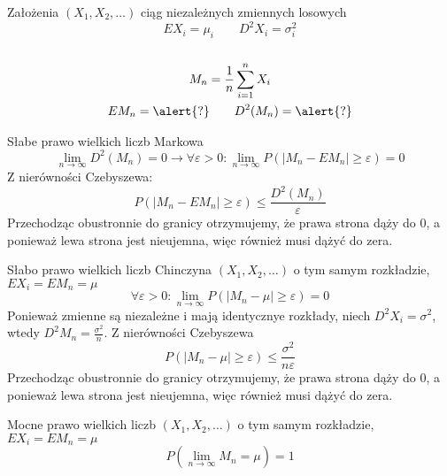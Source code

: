 \documentclass{mp}
\subtitle{Prawa wielkich liczb}
\begin{document}
\frame{\titlepage}
\begin{frame}{Założenia}
$(X_1,X_2,\ldots)$ ciąg niezależnych zmiennych losowych\\
\[EX_i=\mu_i \qquad D^2X_i=\sigma_i^2\] \\
\pause
\begin{gather*}
M_n=\frac{1}{n}\sum_{i=1}^n X_i \\
EM_n=\alert{?} \qquad D^2(M_n)=\alert{?}
\end{gather*}
\note{\[EM_n=\frac{1}{n}\sum_{i=1}^n \mu_i \qquad D^2(M_n)=\frac{1}{n^2}\sum_{i=1}^n\sigma_i^2\]}
\end{frame}
\begin{frame}{Słabe prawo wielkich liczb Markowa}
\[ \lim_{n\to\infty} D^2(M_n)=0 \to \forall \varepsilon>0\colon \lim_{n\to\infty} P(\left|M_n-EM_n\right|\geq\varepsilon)=0 \]
\note
{
	Z nierówności Czebyszewa:
	\[P(\left|M_n-EM_n\right|\geq\varepsilon)\leq \frac{D^2(M_n)}{\varepsilon}\]
	Przechodząc obustronnie do granicy otrzymujemy, że prawa strona dąży do 0, a ponieważ lewa strona jest nieujemna, więc również musi dążyć do zera.
}
\end{frame}
\begin{frame}{Słabo prawo wielkich liczb Chinczyna}
$(X_1,X_2,\ldots)$ o tym samym rozkładzie, $EX_i=EM_n=\mu$
\[ \forall \varepsilon>0\colon \lim_{n\to\infty} P(\left|M_n-\mu\right|\geq\varepsilon)=0 \]
\note
{
	Ponieważ zmienne są niezależne i mają identycznye rozkłady, niech $D^2X_i=\sigma^2$, wtedy $D^2M_n=\frac{\sigma^2}{n}$. Z nierówności Czebyszewa
	\[P(\left|M_n-\mu\right|\geq\varepsilon)\leq \frac{\sigma^2}{n\varepsilon} \]
	Przechodząc obustronnie do granicy otrzymujemy, że prawa strona dąży do 0, a ponieważ lewa strona jest nieujemna, więc również musi dążyć do zera.
}
\end{frame}
\begin{frame}{Mocne prawo wielkich liczb}
$(X_1,X_2,\ldots)$ o tym samym rozkładzie, $EX_i=EM_n=\mu$
\[P(\lim_{n\to\infty} M_n=\mu)=1\]
\end{frame}
\end{document}
